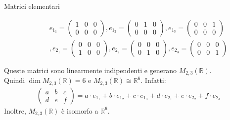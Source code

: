 \documentclass[a4paper]{article}
\theoremstyle{definition}
\begin{document}
\begin{description}
	\item[Matrici elementari] \begin{align*}
			e_{1_1} = \begin{pmatrix}
			1 & 0 & 0 \\
			0 & 0 & 0
		\end{pmatrix}, e_{1_2} = \begin{pmatrix}
			0 & 1 & 0 \\
			0 & 0 & 0
		\end{pmatrix}, e_{1_3} = \begin{pmatrix}
			0 & 0 & 1 \\
			0 & 0 & 0
		\end{pmatrix} \\, e_{2_1} = \begin{pmatrix}
			0 & 0 & 0 \\
			1 & 0 & 0
		\end{pmatrix}, e_{2_2} = \begin{pmatrix}
			0 & 0 & 0 \\
			0 & 1 & 0
		\end{pmatrix}, e_{2_3} = \begin{pmatrix}
			0 & 0 & 0 \\
			0 & 0 & 1
		\end{pmatrix}
	\end{align*}
\end{description}
Queste matrici sono linearmente indipendenti e generano $M_{2,3}(\mathbb{R})$. \\
Quindi $\dim M_{2,3}(\mathbb{R}) = 6$ e $M_{2,3}(\mathbb{R}) \cong \mathbb{R}^6$.
Infatti:
\begin{align*}
	\begin{pmatrix}
		a & b & c \\
		d & e & f
	\end{pmatrix} = a \cdot e_{1_1} + b \cdot e_{1_2} + c \cdot e_{1_3} + d \cdot e_{2_1} + e \cdot e_{2_2} + f \cdot e_{2_3}
\end{align*}
Inoltre, $M_{2,3}(\mathbb{R})$ è isomorfo a $\mathbb{R}^6$.
\end{document}
